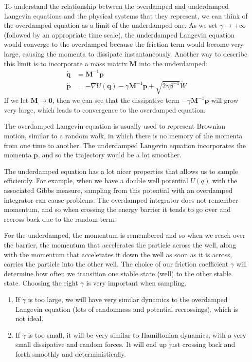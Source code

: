 \documentclass{article}
\begin{document}
    To understand the relationship between the overdamped and underdamped Langevin equations and the physical systems that they represent, we can think of the overdamped equation as a limit of the underdamped one. As we set $\gamma \rightarrow +\infty$ (followed by an appropriate time scale), the underdamped Langevin equation would converge to the overdamped because the friction term would become very large, causing the momenta to dissipate instantaneously. Another way to describe this limit is to incorporate a mass matrix $\mathbf{M}$ into the underdamped: 
    \begin{align*}
      \mathbf{\dot{q}} & = \mathbf{M}^{-1} \mathbf{p} \\
      \mathbf{\dot{p}} & = - \nabla U(\mathbf{q}) - \gamma \mathbf{M}^{-1} \mathbf{p} + \sqrt{2\gamma \beta^{-1}} \dot{W}
    \end{align*}
    If we let $\mathbf{M} \rightarrow \mathbf{0}$, then we can see that the dissipative term $- \gamma \mathbf{M}^{-1}  \mathbf{p}$ will grow very large, which leads to convergence to the overdamped equation. 

    The overdamped Langevin equation is usually used to represent Brownian motion, similar to a random walk, in which there is no memory of the momenta from one time to another. The underdamped Langevin equation incorporates the momenta $\mathbf{p}$, and so the trajectory would be a lot smoother. 

    The underdamped equation has a lot nicer properties that allows us to sample efficiently. For example, when we have a double well potential $U(q)$ with the associated Gibbs measure, sampling from this potential with an overdamped integrator can cause problems. The overdamped integrator does not remember momentum, and so when crossing the energy barrier it tends to go over and recross back due to the random term. 
    \begin{center}
    \end{center}
    For the underdamped, the momentum is remembered and so when we reach over the barrier, the momentum that accelerates the particle across the well, along with the momentum that accelerates it down the well as soon as it is across, carries the particle into the other well. The choice of our friction coefficient $\gamma$ will determine how often we transition one stable state (well) to the other stable state. Choosing the right $\gamma$ is very important when sampling. 
    \begin{enumerate}
      \item If $\gamma$ is too large, we will have very similar dynamics to the overdamped Langevin equation (lots of randomness and potential recrossings), which is not ideal.
      \item If $\gamma$ is too small, it will be very similar to Hamiltonian dynamics, with a very small dissipative and random forces. It will end up just crossing back and forth smoothly and deterministically. 
    \end{enumerate}
\end{document}
